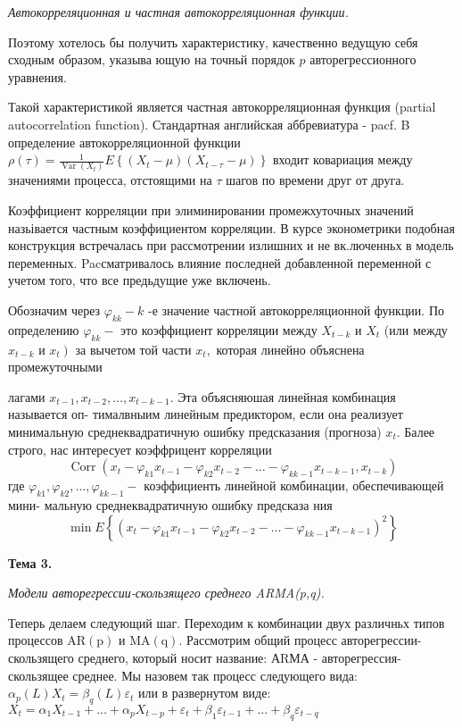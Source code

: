 \documentclass[a4paper,8pt]{article} %
\begin{document}
\textit{Автокорреляционная   и   частная автокорреляционная функции.}

Поэтому хотелось бы получить характеристику, качественно ведущую себя сходным образом, указыва ющую на точньй порядок $p$ авторегрессионного уравнения.

Такой характеристикой является частная автокорреляционная функция (partial autocorrelation function). Стандартная английская аббревиатура - pacf. B определение автокорреляционной функции $\rho(\tau)=\frac{1}{\operatorname{Var}\left(X_{t}\right)} E\left\{\left(X_{t}-\mu\right)\left(X_{t-\tau}-\mu\right)\right\}$ входит ковариация между значениями процесса, отстоящими на $\tau$ шагов по времени друг от друга.

Коэффициент корреляции при элиминировании промежхуточных значений назьівается частным коэффициентом корреляции. В курсе эконометрики подобная конструкция встречалась при рассмотрении излишних и не вк.люченньх в модель переменных. Pacсматривалось влияние последней добавленной переменной с учетом того, что все предьдущие уже включень.

Обозначим через $\varphi_{k k}-k$ -е значение частной автокорреляционной функции.
По определению $\varphi_{k k}-$ это коэффициент корреляции между $X_{t-k}$ и $X_{t}$ (или между $x_{t-k}$ и $\left.x_{t}\right)$ за вычетом той части $x_{t},$ которая линейно объяснена промежуточными

лагами $x_{t-1}, x_{t-2}, \ldots, x_{t-k-1} .$ Эта объясняюшая линейная комбинация называется оп-
тималвныим линейным предиктором, если она реализует минимальную среднеквадратичную ошибку предсказания (прогноза) $x_{t} .$ Балее строго, нас интересует коэффрицент корреляции
$$
\operatorname{Corr}\left(x_{t}-\varphi_{k 1} x_{t-1}-\varphi_{k 2} x_{t-2}-\ldots-\varphi_{k k-1} x_{t-k-1}, x_{t-k}\right)
$$
где $\varphi_{k 1}, \varphi_{k 2}, \ldots, \varphi_{k k-1}-$ коэффициенть линейной комбинации, обеспечивающей мини-
мальную среднеквадратичную ошибку предсказа ния
$$
\min E\left\{\left(x_{t}-\varphi_{k 1} x_{t-1}-\varphi_{k 2} x_{t-2}-\ldots-\varphi_{k k-1} x_{t-k-1}\right)^{2}\right\}
$$


\textbf{Тема 3.}

\textit{
	Модели авторегрессии-скользящего   среднего ARMA(p,q).  
}

Теперь делаем следующий шаг. Переходим к комбинации двух различньх типов процессов $\mathrm{AR}(\mathrm{p})$ и $\mathrm{MA}(\mathrm{q}) .$ Рассмотрим общий процесс авторегрессии-скользящего среднего, который носит название: АRМА - авторегрессия-скользящее среднее. Мы назовем так процесс следующего вида: $\alpha_{p}(L) X_{t}=\beta_{q}(L) \varepsilon_{t}$ или в развернутом виде: $X_{t}=\alpha_{1} X_{t-1}+\ldots+\alpha_{p} X_{t-p}+\varepsilon_{t}+\beta_{1} \varepsilon_{t-1}+\ldots+\beta_{q} \varepsilon_{t-q}$
\end{document}
